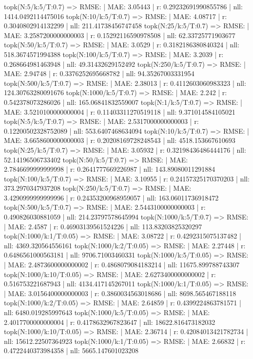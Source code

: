 topk(N:5/k:5/T:0.7) => RMSE: | MAE: 3.05443 | r: 0.29232691990855786 | nll: 1414.0492114475016
topk(N:10/k:5/T:0.7) => RMSE: | MAE: 4.08717 | r: 0.3040802914132299 | nll: 211.41738456747458
topk(N:25/k:5/T:0.7) => RMSE: | MAE: 3.2587200000000003 | r: 0.15292116590978508 | nll: 62.33725771903677
topk(N:50/k:5/T:0.7) => RMSE: | MAE: 3.0529 | r: 0.3182186380840324 | nll: 518.3674571994388
topk(N:100/k:5/T:0.7) => RMSE: | MAE: 3.2039 | r: 0.268664981463948 | nll: 49.31432629152492
topk(N:250/k:5/T:0.7) => RMSE: | MAE: 2.94748 | r: 0.3376252695668782 | nll: 94.35267003331954
topk(N:500/k:5/T:0.7) => RMSE: | MAE: 2.38013 | r: 0.4112603060983323 | nll: 124.30763280091676
topk(N:1000/k:5/T:0.7) => RMSE: | MAE: 2.242 | r: 0.542378073286026 | nll: 165.06841832559007
topk(N:1/k:5/T:0.7) => RMSE: | MAE: 3.5210100000000004 | r: 0.11403311270519118 | nll: 9.371014584105021
topk(N:5/k:5/T:0.7) => RMSE: | MAE: 2.5317000000000003 | r: 0.12200502328752089 | nll: 553.6407468634094
topk(N:10/k:5/T:0.7) => RMSE: | MAE: 3.6658600000000003 | r: 0.20208169728248543 | nll: 4518.153667610693
topk(N:25/k:5/T:0.7) => RMSE: | MAE: 3.05932 | r: 0.32198436486444176 | nll: 52.14196506733402
topk(N:50/k:5/T:0.7) => RMSE: | MAE: 2.7846699999999998 | r: 0.2641777669226987 | nll: 143.89080011291884
topk(N:100/k:5/T:0.7) => RMSE: | MAE: 3.10955 | r: 0.24157325170370203 | nll: 373.2970347937208
topk(N:250/k:5/T:0.7) => RMSE: | MAE: 3.4290999999999996 | r: 0.24353200968959057 | nll: 163.06011736918472
topk(N:500/k:5/T:0.7) => RMSE: | MAE: 2.5443100000000003 | r: 0.490826030881059 | nll: 214.23797578645994
topk(N:1000/k:5/T:0.7) => RMSE: | MAE: 2.4587 | r: 0.46903139561524226 | nll: 113.83203825320297
topk(N:1000/k:1/T:0.05) => RMSE: | MAE: 3.08722 | r: 0.4292315075137482 | nll: 4369.320564556161
topk(N:1000/k:2/T:0.05) => RMSE: | MAE: 2.27448 | r: 0.6486561000563181 | nll: 9706.71003460331
topk(N:1000/k:5/T:0.05) => RMSE: | MAE: 2.4873600000000002 | r: 0.4868079084183214 | nll: 11675.899788743307
topk(N:1000/k:10/T:0.05) => RMSE: | MAE: 2.6273400000000002 | r: 0.516753221687943 | nll: 4134.417145267011
topk(N:1000/k:1/T:0.05) => RMSE: | MAE: 3.0156400000000003 | r: 0.3860034563018686 | nll: 8698.565467188118
topk(N:1000/k:2/T:0.05) => RMSE: | MAE: 2.64859 | r: 0.4399224863781571 | nll: 6480.019285997643
topk(N:1000/k:5/T:0.05) => RMSE: | MAE: 2.4017700000000004 | r: 0.4178632967823647 | nll: 18622.816473182032
topk(N:1000/k:10/T:0.05) => RMSE: | MAE: 2.36714 | r: 0.42084013421782734 | nll: 15612.22507364923
topk(N:1000/k:1/T:0.05) => RMSE: | MAE: 2.66832 | r: 0.4722440373984358 | nll: 5665.147601023208
